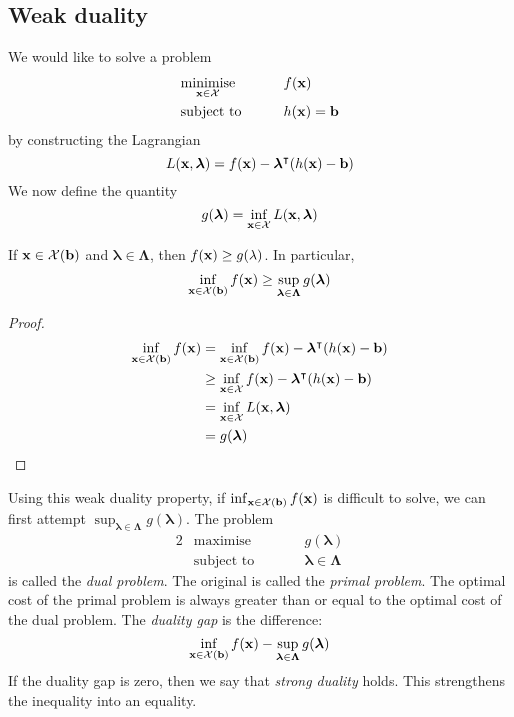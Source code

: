 \subsection{Weak duality}
We would like to solve a problem
\begin{alignat*}{2}
	 & \underset{\vb x \in \mathcal X}{\text{minimise}} & \qquad & f(\vb x)         \\
	 & \text{subject to}                                &        & h(\vb x) = \vb b
\end{alignat*}
by constructing the Lagrangian
\[
	L(\vb x, \bm \lambda) = f(\vb x) - \bm\lambda^\intercal (h(\vb x) - \vb b)
\]
We now define the quantity
\[
	g(\bm \lambda) = \inf_{\vb x \in \mathcal X} L(\vb x, \bm \lambda)
\]
\begin{theorem}
	If \( \vb x \in \mathcal X(\vb b) \) and \( \bm\lambda \in \bm\Lambda \), then \( f(\vb x) \geq g(\lambda) \).
	In particular,
	\[
		\inf_{\vb x \in \mathcal X(\vb b)} f(\vb x) \geq \sup_{\bm \lambda \in \bm \Lambda} g(\bm \lambda)
	\]
\end{theorem}
\begin{proof}
	\begin{align*}
		\inf_{\vb x \in \mathcal X(\vb b)} f(\vb x) & = \inf_{\vb x \in \mathcal X(\vb b)} f(\vb x) - \bm \lambda^\intercal (h(\vb x) - \vb b) \\
		                                            & \geq \inf_{\vb x \in \mathcal X} f(\vb x) - \bm \lambda^\intercal (h(\vb x) - \vb b)     \\
		                                            & = \inf_{\vb x \in \mathcal X} L(\vb x, \bm \lambda)                                       \\
		                                            & = g(\bm\lambda)
	\end{align*}
\end{proof}
Using this weak duality property, if \( \inf_{\vb x \in \mathcal X(\vb b)} f(\vb x) \) is difficult to solve, we can first attempt \( \sup_{\bm \lambda \in \bm \Lambda} g(\bm \lambda) \).
The problem
\begin{alignat*}{2}
	 & \text{maximise}   & \qquad & g(\bm \lambda)              \\
	 & \text{subject to} &        & \bm \lambda \in \bm \Lambda
\end{alignat*}
is called the \textit{dual problem}.
The original is called the \textit{primal problem}.
The optimal cost of the primal problem is always greater than or equal to the optimal cost of the dual problem.
The \textit{duality gap} is the difference:
\[
	\inf_{\vb x \in \mathcal X(\vb b)} f(\vb x) - \sup_{\bm \lambda \in \bm \Lambda} g(\bm \lambda)
\]
If the duality gap is zero, then we say that \textit{strong duality} holds.
This strengthens the inequality into an equality.

